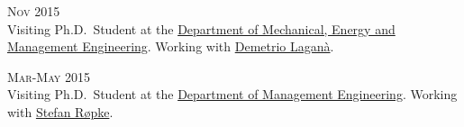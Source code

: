 \begin{paracol}{2}
  \textsc{Nov 2015}
\switchcolumn
  \\
  Visiting Ph.D.\ Student at the \href{http://www.unical.it/portale/strutture/dipartimenti_240/dimeg/}{Department of Mechanical, Energy and Management Engineering}. Working with \href{https://scholar.google.com/citations?user=r_qFOqgAAAAJ}{Demetrio Laganà}.
\end{paracol}

\begin{paracol}{2}
  \textsc{Mar-May 2015}
\switchcolumn
  \\
  Visiting Ph.D.\ Student at the \href{http://www.man.dtu.dk/english}{Department of Management Engineering}. Working with \href{https://scholar.google.com/citations?user=sYi141QAAAAJ}{Stefan Røpke}.
\end{paracol}

%

%
